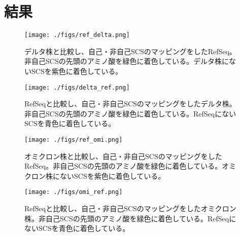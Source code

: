 \chapter{結果}





\begin{figure}[H]
	\centering
	\texttt{[image: ./figs/ref\_delta.png]}
	\caption{デルタ株と比較し、自己・非自己SCSのマッピングをしたRefSeq。非自己SCSの先頭のアミノ酸を緑色に着色している。デルタ株にないSCSを紫色に着色している。}
	\label{ref_delta}
\end{figure}

\begin{figure}[H]
	\centering
	\texttt{[image: ./figs/delta\_ref.png]}
	\caption{RefSeqと比較し、自己・非自己SCSのマッピングをしたデルタ株。非自己SCSの先頭のアミノ酸を緑色に着色している。RefSeqにないSCSを青色に着色している。}
	\label{delta_ref}
\end{figure}

\begin{figure}[H]
	\centering
	\texttt{[image: ./figs/ref\_omi.png]}
	\caption{オミクロン株と比較し、自己・非自己SCSのマッピングをしたRefSeq。非自己SCSの先頭のアミノ酸を緑色に着色している。オミクロン株にないSCSを紫色に着色している。}
	\label{ref_omi}
\end{figure}

\begin{figure}[H]
	\centering
	\texttt{[image: ./figs/omi\_ref.png]}
	\caption{RefSeqと比較し、自己・非自己SCSのマッピングをしたオミクロン株。非自己SCSの先頭のアミノ酸を緑色に着色している。RefSeqにないSCSを青色に着色している。}
	\label{omi_ref}
\end{figure}

